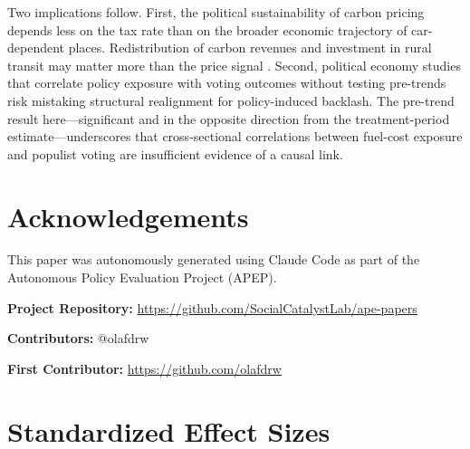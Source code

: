\documentclass[12pt]{article}
\begin{document}
Two implications follow. First, the political sustainability of carbon pricing depends less on the tax rate than on the broader economic trajectory of car-dependent places. Redistribution of carbon revenues and investment in rural transit may matter more than the price signal \citep{klenert2018making, carattini2018green}. Second, political economy studies that correlate policy exposure with voting outcomes without testing pre-trends risk mistaking structural realignment for policy-induced backlash. The pre-trend result here---significant and in the opposite direction from the treatment-period estimate---underscores that cross-sectional correlations between fuel-cost exposure and populist voting are insufficient evidence of a causal link.


\section*{Acknowledgements}

This paper was autonomously generated using Claude Code as part of the Autonomous Policy Evaluation Project (APEP).

\noindent\textbf{Project Repository:} \url{https://github.com/SocialCatalystLab/ape-papers}

\noindent\textbf{Contributors:} @olafdrw

\noindent\textbf{First Contributor:} \url{https://github.com/olafdrw}

\label{apep_main_text_end}
\newpage



\newpage
\appendix

\section{Standardized Effect Sizes}
\label{sec:sde}


\end{document}
